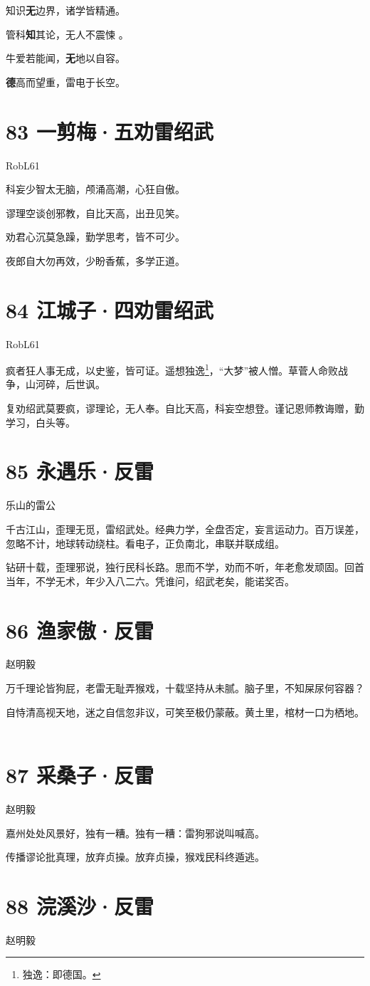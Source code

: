 \documentclass[UTF8,12pt,oneside]{ctexbook}
\def\pau#1{\begin{center} {#1} \end{center}} %
\def\poem#1#2{\section{#1}\pau{#2}} %
\def\lidend{\setlength\parindent{2em}}
\begin{document}
         知识\textbf{无}边界，诸学皆精通。
         
         管科\textbf{知}其论，无人不震悚 。
         
         牛爱若能闻，\textbf{无}地以自容。
         
         \textbf{德}高而望重，雷电于长空。

     \lidend

\poem{83 一剪梅·五劝雷绍武}{RobL61}
\begin{center}
    科妄少智太无脑，颅涌高潮，心狂自傲。 

    谬理空谈创邪教，自比天高，出丑见笑。 

    劝君心沉莫急躁，勤学思考，皆不可少。 
    
    夜郎自大勿再效，少盼香蕉，多学正道。


    \end{center}

\newpage
\poem{84 江城子·四劝雷绍武}{RobL61}
    
    疯者狂人事无成，以史鉴，皆可证。遥想独逸\footnote{独逸：即德国。}，“大梦”被人憎。草菅人命败战争，山河碎，后世讽。 
    
    复劝绍武莫要疯，谬理论，无人奉。自比天高，科妄空想登。谨记恩师教诲赠，勤学习，白头等。
    ~\\

\poem{85 永遇乐·反雷}{乐山的雷公}

    千古江山，歪理无觅，雷绍武处。经典力学，全盘否定，妄言运动力。百万误差，忽略不计，地球转动绕柱。看电子，正负南北，串联并联成组。
    
    钻研十载，歪理邪说，独行民科长路。思而不学，劝而不听，年老愈发顽固。回首当年，不学无术，年少入八二六。凭谁问，绍武老矣，能诺奖否。

\newpage

\poem{86 渔家傲·反雷}{赵明毅}

    万千理论皆狗屁，老雷无耻弄猴戏，十载坚持从未腻。脑子里，不知屎尿何容器？
    
    自恃清高视天地，迷之自信忽非议，可笑至极仍蒙蔽。黄土里，棺材一口为栖地。
    ~\\

\poem{87 采桑子·反雷}{赵明毅}

    嘉州处处风景好，独有一糟。独有一糟：雷狗邪说叫喊高。 
    
    传播谬论批真理，放弃贞操。放弃贞操，猴戏民科终遁逃。
    ~\\

\poem{88 浣溪沙·反雷}{赵明毅}
\end{document}
